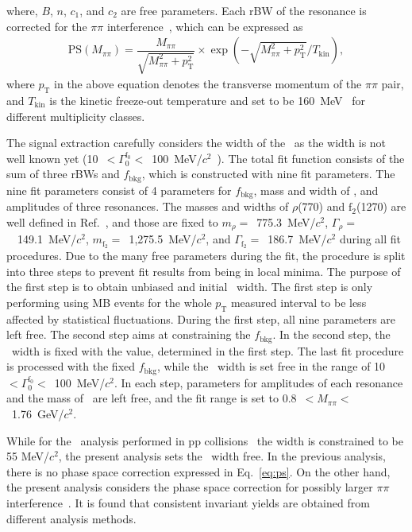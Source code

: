 where, $B$, $n$, $c_{1}$, and $c_{2}$ are free parameters. Each rBW of the resonance is corrected for the $\pi\pi$ interference~\cite{Rapp:2003ar}, which can be expressed as
\begin{eqnarray}
\mathrm{PS}(M_{\pi\pi}) = \dfrac{M_{\pi\pi}}{\sqrt{M_{\pi\pi}^{2}+p_{\mathrm{T}}^{2}}}\times\exp{(-\sqrt{M_{\pi\pi}^{2}+p_{\mathrm{T}}^{2}}/T_{\mathrm{kin}})},
\label{eq:ps}
\end{eqnarray} 
where $p_{\mathrm{T}}$ in the above equation denotes the transverse momentum of the $\pi\pi$ pair, and $T_{\mathrm{kin}}$ is the kinetic freeze-out temperature and set to be 160~MeV~\cite{ALICE:2018qdv} for different multiplicity classes.

The signal extraction carefully considers the width of the \fzero~as the width is not well known yet (10~$<\Gamma_{0}^{\mathrm{f}_{0}}<$~100~MeV/$c^{2}$~\cite{ParticleDataGroup:2022pth}). The total fit function consists of the sum of three rBWs and $f_{\mathrm{bkg}}$, which is constructed with nine fit parameters. The nine fit parameters consist of 4 parameters for $f_{\mathrm{bkg}}$, mass and width of \fzero, and amplitudes of three resonances. The masses and widths of $\rho$(770) and $\mathrm{f}_{2}$(1270) are well defined in Ref.~\cite{ParticleDataGroup:2022pth}, and those are fixed to $m_{\rho}=$~775.3~MeV/$c^{2}$, $\Gamma_{\rho}=$~~149.1~MeV/$c^{2}$, $m_{\mathrm{f}_{2}}=$~1,275.5~MeV/$c^{2}$, and $\Gamma_{\mathrm{f}_{2}}=$~186.7~MeV/$c^{2}$ during all fit procedures. Due to the many free parameters during the fit, the procedure is split into three steps to prevent fit results from being in local minima. The purpose of the first step is to obtain unbiased and initial \fzero~width. The first step is only performing using MB events for the whole $p_{\mathrm{T}}$ measured interval to be less affected by statistical fluctuations. During the first step, all nine parameters are left free. The second step aims at constraining the $f_{\mathrm{bkg}}$. In the second step, the \fzero~width is fixed with the value, determined in the first step. The last fit procedure is processed with the fixed $f_{\mathrm{bkg}}$, while the \fzero~width is set free in the range of 10~$<\Gamma_{0}^{\mathrm{f}_{0}}<$~100~MeV/$c^{2}$. In each step, parameters for amplitudes of each resonance and the mass of \fzero~are left free, and the fit range is set to 0.8~$<M_{\pi\pi}<$~1.76~GeV/$c^{2}$.

While for the \fzero~analysis performed in pp collisions~\cite{ALICE:2022qnb} the width is constrained to be 55 MeV/$c^{2}$, the present analysis sets the \fzero~width free. In the previous analysis, there is no phase space correction expressed in Eq.~\ref{eq:ps}. On the other hand, the present analysis considers the phase space correction for possibly larger $\pi\pi$ interference~\cite{STAR:2003vqj}. It is found that consistent invariant yields are obtained from different analysis methods.

